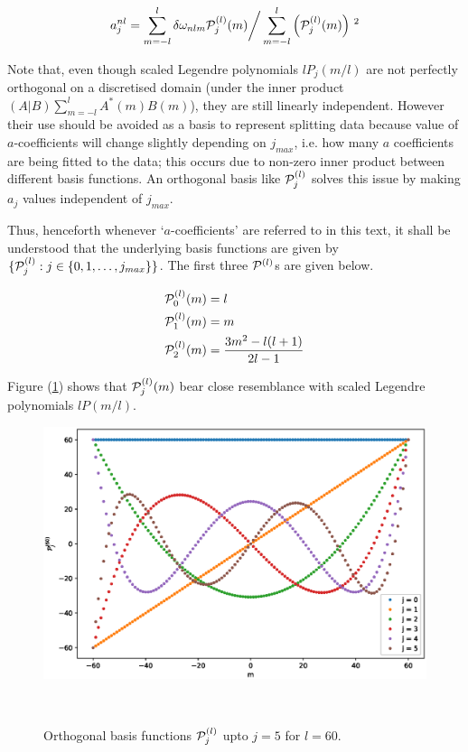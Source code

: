\begin{equation}
a^{nl}_j = \sum_{m=-l}^l \delta\omega_{nlm}\mathcal{P}^{(l)}_j(m) \bigg/ \sum_{m=-l}^l \left( \mathcal{P}^{(l)}_j(m) \right)\,^2
\end{equation}


Note that, even though scaled Legendre polynomials $lP_j(m/l)$ are not perfectly orthogonal on a discretised domain (under the inner product $(A|B)\sum_{m=-l}^l A^*(m)B(m)$), they are still linearly independent. However their use should be avoided as a basis to represent splitting data because value of $a$-coefficients will change slightly depending on $j_{max}$, i.e. how many $a$ coefficients are being fitted to the data; this occurs due to non-zero inner product between different basis functions. An orthogonal basis like $\mathcal{P}^{(l)}_j$ solves this issue by making $a_j$ values independent of $j_{max}$.

Thus, henceforth whenever `$a$-coefficients' are referred to in this text, it shall be understood that the underlying basis functions are given by $\{\mathcal{P}^{(l)}_j: j\in \{0,1,\dots,j_{max}\}\}$. The first three $\mathcal{P}^{(l)}$s are given below.

\begin{align}
\mathcal{P}^{(l)}_{0}(m) &= l \\
\mathcal{P}^{(l)}_1(m) &= m \\
\mathcal{P}^{(l)}_2(m) &= \frac{3m^2-l(l+1)}{2l-1}
\end{align}

Figure (\ref{fig:curly_p}) shows that $\mathcal{P}^{(l)}_j(m)$ bear close resemblance with scaled Legendre polynomials $lP(m/l)$.
\begin{figure}[h]
\includegraphics[scale=0.6, center]{Chapter1/figs/curly_p}
\caption{Orthogonal basis functions $\mathcal{P}^{(l)}_{j}$ upto $j=5$ for $l=60$.}\
\label{fig:curly_p}
\end{figure}
